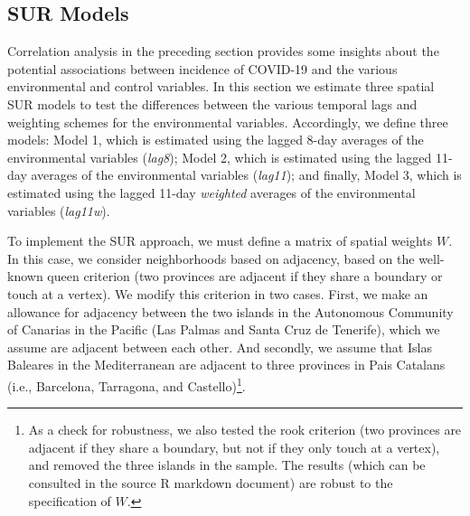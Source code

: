 \documentclass[]{elsarticle} %
\begin{document}
\hypertarget{sur-models}{%
\subsection{SUR Models}\label{sur-models}}

Correlation analysis in the preceding section provides some insights
about the potential associations between incidence of COVID-19 and the
various environmental and control variables. In this section we estimate
three spatial SUR models to test the differences between the various
temporal lags and weighting schemes for the environmental variables.
Accordingly, we define three models: Model 1, which is estimated using
the lagged 8-day averages of the environmental variables (\emph{lag8});
Model 2, which is estimated using the lagged 11-day averages of the
environmental variables (\emph{lag11}); and finally, Model 3, which is
estimated using the lagged 11-day \emph{weighted} averages of the
environmental variables (\emph{lag11w}).

To implement the SUR approach, we must define a matrix of spatial
weights \(W\). In this case, we consider neighborhoods based on
adjacency, based on the well-known queen criterion (two provinces are
adjacent if they share a boundary or touch at a vertex). We modify this
criterion in two cases. First, we make an allowance for adjacency
between the two islands in the Autonomous Community of Canarias in the
Pacific (Las Palmas and Santa Cruz de Tenerife), which we assume are
adjacent between each other. And secondly, we assume that Islas Baleares
in the Mediterranean are adjacent to three provinces in Pais Catalans
(i.e., Barcelona, Tarragona, and
Castello)\footnote{As a check for robustness, we also tested the rook criterion (two provinces are adjacent if they share a boundary, but not if they only touch at a vertex), and removed the three islands in the sample. The results (which can be consulted in the source R markdown document) are robust to the specification of $W$.}.
\end{document}
